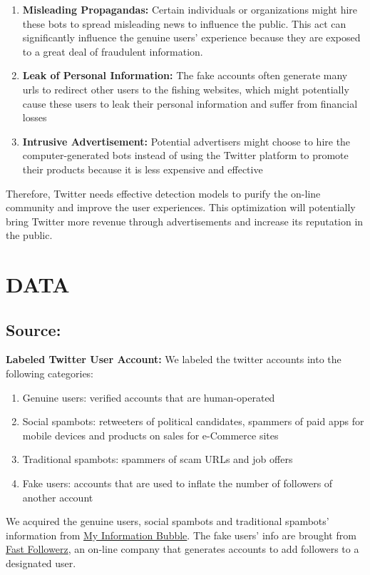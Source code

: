 \documentclass[a4paper, 12pt]{report}
\begin{document}
\begin{enumerate}
	\item \textbf{Misleading Propagandas:} Certain individuals or organizations might hire these bots to spread misleading news to influence the public. This act can significantly influence the genuine users' experience because they are exposed to a great deal of fraudulent information.
	\item \textbf{Leak of Personal Information:} The fake accounts often generate many urls to redirect other users to the fishing websites, which might potentially cause these users to leak their personal information and suffer from financial losses 
	\item \textbf{Intrusive Advertisement:} Potential advertisers might choose to hire the computer-generated bots instead of using the Twitter platform to promote their products because it is less expensive and effective

\end{enumerate}
Therefore, Twitter needs effective detection models to purify the on-line community and improve the user experiences. This optimization will potentially bring Twitter more revenue through advertisements and increase its reputation in the public.


\section*{DATA}
\subsection*{Source:}
\textbf{Labeled Twitter User Account:} We labeled the twitter accounts into the following categories:
\begin{enumerate}
	\item Genuine users: verified accounts that are human-operated
	\item Social spambots: retweeters of political candidates, spammers of paid apps for mobile devices and products on sales for e-Commerce sites
	\item Traditional spambots: spammers of scam URLs and job offers	
	\item Fake users: accounts that are used to inflate the number of followers of another account
\end{enumerate}
We acquired the genuine users, social spambots and traditional spambots' information from \href{http://mib.projects.iit.cnr.it/dataset.html}{My Information Bubble}. The fake users' info are brought from \href{https://www.fastfollowerz.com/closed/}{Fast Followerz}, an on-line company that generates accounts to add followers to a designated user. \par
\end{document}

